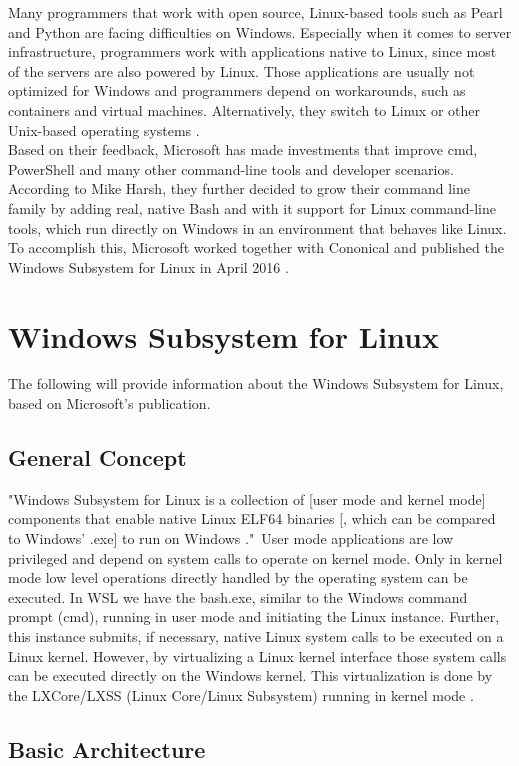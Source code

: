 \documentclass[utf8,biblatex, ngerman, english]{lni}
\begin{document}
Many programmers that work with open source, Linux-based tools such as Pearl and Python are facing difficulties on Windows. Especially when it comes to server infrastructure, programmers work with applications native to Linux, since most of the servers are also powered by Linux. Those applications are usually not optimized for Windows and programmers depend on workarounds, such as containers and virtual machines. Alternatively, they switch to Linux or other Unix-based operating systems \cite{Ha16c}.\\
Based on their feedback, Microsoft has made investments that improve cmd, PowerShell and many other command-line tools and developer scenarios. According to Mike Harsh, they further decided to grow their command line family by adding real, native Bash and with it support for Linux command-line tools, which run directly on Windows in an environment that behaves like Linux. To accomplish this, Microsoft worked together with Cononical and published the Windows Subsystem for Linux in April 2016 \cite{Ha16c}. 

\section{Windows Subsystem for Linux}
The following will provide information about the Windows Subsystem for Linux, based on Microsoft's publication.

\subsection{General Concept}
"Windows Subsystem for Linux is a collection of [user mode and kernel mode] components that enable native Linux ELF64 binaries [, which can be compared to Windows' .exe] to run on Windows \cite{Ha16b}."\ User mode applications are low privileged and depend on system calls to operate on kernel mode. Only in kernel mode low level operations directly handled by the operating system can be executed. In WSL we have the bash.exe, similar to the Windows command prompt (cmd), running in user mode and initiating the Linux instance. Further, this instance submits, if necessary, native Linux system calls to be executed on a Linux kernel. However, by virtualizing a Linux kernel interface those system calls can be executed directly on the Windows kernel. This virtualization is done by the LXCore/LXSS (Linux Core/Linux Subsystem) running in kernel mode \cite{Ha16b}.

\subsection{Basic Architecture}
\end{document}
